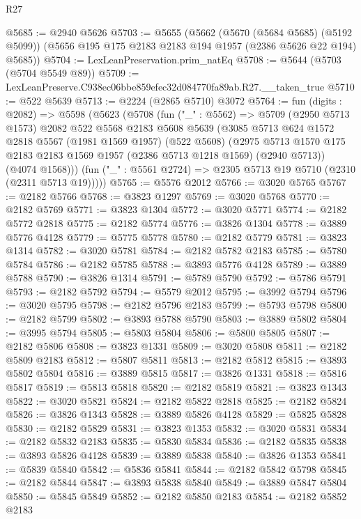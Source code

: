 \begin{lexlean}{R27}
\begin{coremodule}
@5685 := @2940 @5626
@5703 := @5655
    (@5662
      (@5670 (@5684 @5685) (@5192 @5099))
      (@5656 @195 @175 @2183 @2183 @194 @1957 (@2386 @5626 @22 @194) @5685))
@5704 := LexLeanPreservation.prim_natEq
@5708 := @5644 (@5703 (@5704 @5549 @89))
@5709 := LexLeanPreserve.C938ec06bbe859efec32d084770fa89ab.R27.__taken_true
@5710 := @522 @5639
@5713 := @2224 (@2865 @5710) @3072
@5764 := fun (digits : @2082) =>
  @5598
    (@5623
      (@5708
        (fun ("_" : @5562) =>
        @5709
          (@2950 @5713 @1573)
          @2082
          @522
          @5568
          @2183
          @5608
          @5639
          (@3085
            @5713
            @624
            @1572
            @2818
            @5567
            (@1981 @1569 @1957)
            (@522 @5608)
            (@2975 @5713 @1570 @175 @2183 @2183 @1569 @1957 (@2386 @5713 @1218 @1569) (@2940 @5713))
            (@4074 @1568)))
        (fun ("_" : @5561 @2724) => @2305 @5713 @19 @5710 (@2310 (@2311 @5713 @19)))))
@5765 := @5576 @2012
@5766 := @3020 @5765
@5767 := @2182 @5766
@5768 := @3823 @1297
@5769 := @3020 @5768
@5770 := @2182 @5769
@5771 := @3823 @1304
@5772 := @3020 @5771
@5774 := @2182 @5772 @2818
@5775 := @2182 @5774
@5776 := @3826 @1304
@5778 := @3889 @5776 @4128
@5779 := @5775 @5778
@5780 := @2182 @5779
@5781 := @3823 @1314
@5782 := @3020 @5781
@5784 := @2182 @5782 @2183
@5785 := @5780 @5784
@5786 := @2182 @5785
@5788 := @3893 @5776 @4128
@5789 := @3889 @5788
@5790 := @3826 @1314
@5791 := @5789 @5790
@5792 := @5786 @5791
@5793 := @2182 @5792
@5794 := @5579 @2012
@5795 := @3992 @5794
@5796 := @3020 @5795
@5798 := @2182 @5796 @2183
@5799 := @5793 @5798
@5800 := @2182 @5799
@5802 := @3893 @5788 @5790
@5803 := @3889 @5802
@5804 := @3995 @5794
@5805 := @5803 @5804
@5806 := @5800 @5805
@5807 := @2182 @5806
@5808 := @3823 @1331
@5809 := @3020 @5808
@5811 := @2182 @5809 @2183
@5812 := @5807 @5811
@5813 := @2182 @5812
@5815 := @3893 @5802 @5804
@5816 := @3889 @5815
@5817 := @3826 @1331
@5818 := @5816 @5817
@5819 := @5813 @5818
@5820 := @2182 @5819
@5821 := @3823 @1343
@5822 := @3020 @5821
@5824 := @2182 @5822 @2818
@5825 := @2182 @5824
@5826 := @3826 @1343
@5828 := @3889 @5826 @4128
@5829 := @5825 @5828
@5830 := @2182 @5829
@5831 := @3823 @1353
@5832 := @3020 @5831
@5834 := @2182 @5832 @2183
@5835 := @5830 @5834
@5836 := @2182 @5835
@5838 := @3893 @5826 @4128
@5839 := @3889 @5838
@5840 := @3826 @1353
@5841 := @5839 @5840
@5842 := @5836 @5841
@5844 := @2182 @5842 @5798
@5845 := @2182 @5844
@5847 := @3893 @5838 @5840
@5849 := @3889 @5847 @5804
@5850 := @5845 @5849
@5852 := @2182 @5850 @2183
@5854 := @2182 @5852 @2183

\end{coremodule}
\end{lexlean}
